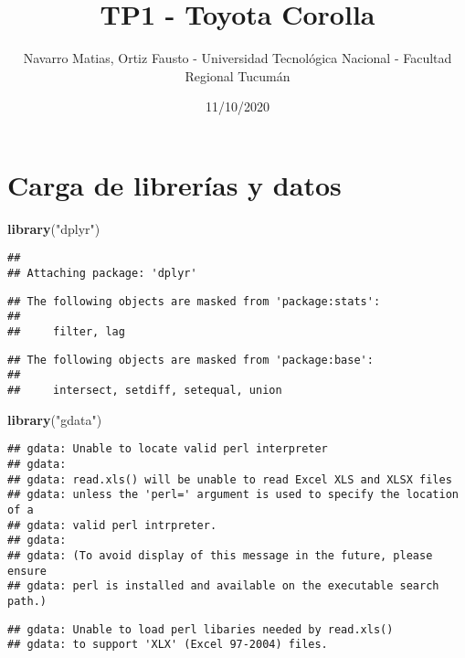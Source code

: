 \documentclass[
]{article}
\title{TP1 - Toyota Corolla}
\author{Navarro Matias, Ortiz Fausto - Universidad Tecnológica Nacional -
Facultad Regional Tucumán}
\date{11/10/2020}
\newenvironment{Shaded}{\begin{snugshade}}{\end{snugshade}}
\newcommand{\KeywordTok}[1]{\textcolor[rgb]{0.13,0.29,0.53}{\textbf{#1}}}
\newcommand{\NormalTok}[1]{#1}
\newcommand{\StringTok}[1]{\textcolor[rgb]{0.31,0.60,0.02}{#1}}
\begin{document}
\maketitle

\hypertarget{carga-de-libreruxedas-y-datos}{%
\section{Carga de librerías y
datos}\label{carga-de-libreruxedas-y-datos}}

\begin{Shaded}
\begin{Highlighting}[]
\KeywordTok{library}\NormalTok{(}\StringTok{"dplyr"}\NormalTok{)}
\end{Highlighting}
\end{Shaded}

\begin{verbatim}
## 
## Attaching package: 'dplyr'
\end{verbatim}

\begin{verbatim}
## The following objects are masked from 'package:stats':
## 
##     filter, lag
\end{verbatim}

\begin{verbatim}
## The following objects are masked from 'package:base':
## 
##     intersect, setdiff, setequal, union
\end{verbatim}

\begin{Shaded}
\begin{Highlighting}[]
\KeywordTok{library}\NormalTok{(}\StringTok{"gdata"}\NormalTok{)}
\end{Highlighting}
\end{Shaded}

\begin{verbatim}
## gdata: Unable to locate valid perl interpreter
## gdata: 
## gdata: read.xls() will be unable to read Excel XLS and XLSX files
## gdata: unless the 'perl=' argument is used to specify the location of a
## gdata: valid perl intrpreter.
## gdata: 
## gdata: (To avoid display of this message in the future, please ensure
## gdata: perl is installed and available on the executable search path.)
\end{verbatim}

\begin{verbatim}
## gdata: Unable to load perl libaries needed by read.xls()
## gdata: to support 'XLX' (Excel 97-2004) files.
\end{verbatim}
\end{document}
